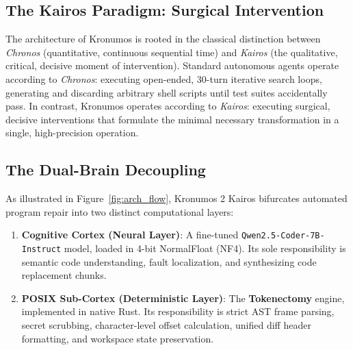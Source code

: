 \documentclass[10pt,twocolumn,letterpaper]{article}
\begin{document}
\subsection{The Kairos Paradigm: Surgical Intervention}
The architecture of Kronumos is rooted in the classical distinction between \textit{Chronos} (quantitative, continuous sequential time) and \textit{Kairos} (the qualitative, critical, decisive moment of intervention). Standard autonomous agents operate according to \textit{Chronos}: executing open-ended, 30-turn iterative search loops, generating and discarding arbitrary shell scripts until test suites accidentally pass. In contrast, Kronumos operates according to \textit{Kairos}: executing surgical, decisive interventions that formulate the minimal necessary transformation in a single, high-precision operation.

\subsection{The Dual-Brain Decoupling}
As illustrated in Figure~\ref{fig:arch_flow}, Kronumos 2 Kairos bifurcates automated program repair into two distinct computational layers:
\begin{enumerate}
    \item \textbf{Cognitive Cortex (Neural Layer)}: A fine-tuned \texttt{Qwen2.5-Coder-7B-Instruct} model, loaded in 4-bit NormalFloat (NF4). Its sole responsibility is semantic code understanding, fault localization, and synthesizing code replacement chunks.
    \item \textbf{POSIX Sub-Cortex (Deterministic Layer)}: The \textbf{Tokenectomy} engine, implemented in native Rust. Its responsibility is strict AST frame parsing, secret scrubbing, character-level offset calculation, unified diff header formatting, and workspace state preservation.
\end{enumerate}
\end{document}
